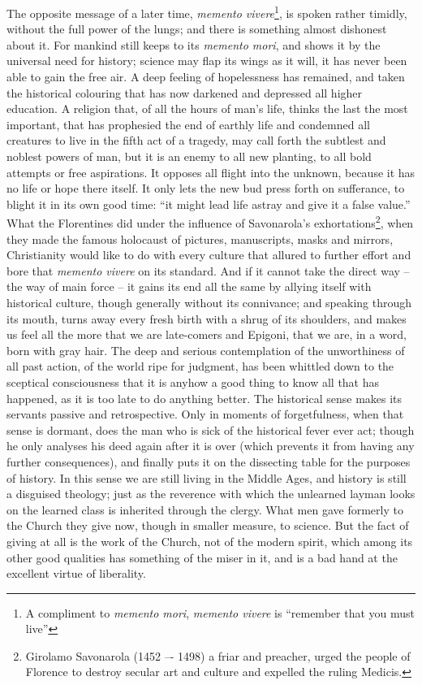 The opposite message of a later time, \textit{memento vivere}\footnote{A compliment to \textit{memento mori}, \textit{memento vivere} is \enquote{remember that you must live}}, is spoken
rather timidly, without the full power of the lungs; and there is
something almost dishonest about it. For mankind still keeps to its
\textit{memento mori}, and shows it by the universal need for history;
science may flap its wings as it will, it has never been able to gain
the free air. A deep feeling of hopelessness has remained, and taken
the historical colouring that has now darkened and depressed all
higher education. A religion that, of all the hours of man's life,
thinks the last the most important, that has prophesied the end of
earthly life and condemned all creatures to live in the fifth act of
a tragedy, may call forth the subtlest and noblest powers of man, but
it is an enemy to all new planting, to all bold attempts or free
aspirations. It opposes all flight into the unknown, because it has
no life or hope there itself. It only lets the new bud press forth on
sufferance, to blight it in its own good time: \enquote{it might lead life
astray and give it a false value.} What the Florentines did under the
influence of Savonarola's exhortations\footnote{Girolamo Savonarola (1452 –- 1498) a friar and preacher, urged the people of Florence to destroy  secular art and culture and expelled the ruling Medicis.}, when they made the famous
holocaust of pictures, manuscripts, masks and mirrors, Christianity
would like to do with every culture that allured to further effort
and bore that \textit{memento vivere} on its standard. And if it cannot take
the direct way -- the way of main force -- it gains its end all the same
by allying itself with historical culture, though generally without
its connivance; and speaking through its mouth, turns away every
fresh birth with a shrug of its shoulders, and makes us feel all the
more that we are late-comers and Epigoni, that we are, in a word,
born with gray hair. The deep and serious contemplation of the
unworthiness of all past action, of the world ripe for judgment, has
been whittled down to the sceptical consciousness that it is anyhow a
good thing to know all that has happened, as it is too late to do
anything better. The historical sense makes its servants passive and
retrospective. Only in moments of forgetfulness, when that sense is
dormant, does the man who is sick of the historical fever ever act;
though he only analyses his deed again after it is over (which
prevents it from having any further consequences), and finally puts
it on the dissecting table for the purposes of history. In this sense
we are still living in the Middle Ages, and history is still a
disguised theology; just as the reverence with which the unlearned
layman looks on the learned class is inherited through the clergy.
What men gave formerly to the Church they give now, though in smaller
measure, to science. But the fact of giving at all is the work of the
Church, not of the modern spirit, which among its other good
qualities has something of the miser in it, and is a bad hand at the
excellent virtue of liberality.

